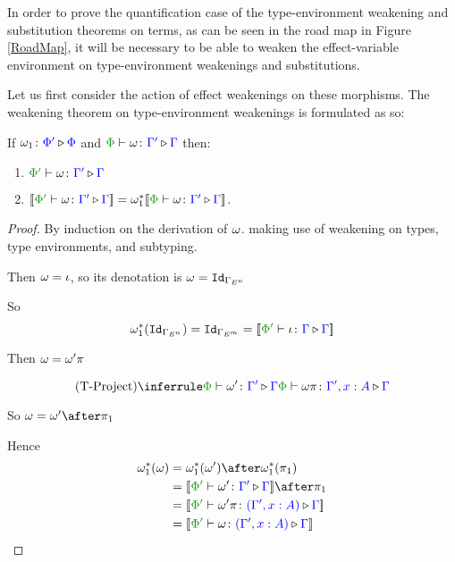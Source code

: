 \documentclass{Report}
\begin{document}
In order to prove the quantification case of the type-environment weakening and substitution theorems on terms, as can be seen in the road map in Figure \ref{RoadMap}, it will be necessary to be able to weaken the effect-variable environment on type-environment weakenings and substitutions.

Let us first consider the action of effect weakenings on these morphisms. The weakening theorem on type-environment weakenings is formulated as so:



\begin{framed}
    \begin{theorem}\label{EffectWeakeningOnTermWeakening}
        If $\omega_1 \colon {\color{blue}\Phi'} \triangleright {\color {blue} \Phi}$ and $\pewrel{\w}{\G'}{\G}$ then:
        \begin{enumerate}[label=\roman*.]
            \item $\ewrel{\P'}{\w}{\G'}{\G}$
            \item $\deno{\ewrel{\P'}{\w}{\G'}{\G}} = \w_1\star\deno{\pewrel{\w}{\G'}{\G}}$.
        \end{enumerate} 
    \end{theorem}
    
    \begin{proof}
        By induction on the derivation of $\omega$. making use of weakening on types, type environments, and subtyping.
    
        \case{\tid}
        Then $\omega = \iota$, so its denotation is $\omega = \texttt{Id}_{\Gamma_{E^n}}$
        
        So
        \begin{equation}
          \w_1\star(\Id{\G_{E^n}}) = \Id{\G_{E^m}} = \deno{\ewrel{\P'}{\i}{\G}{\G}}  
        \end{equation}
        
        \case{\tproject}
        Then $\omega = \omega'\pi$
        
        \begin{equation}
            \ntreeruleI{\tproject}{\ewrel{\P}{\w'}{\G'}{\G}}{\ewrel{\P}{\w\pi}{\G',x:A}{\G}}
        \end{equation}
        
        So $\w = \w'\after\p$
        
        Hence
        \begin{align*}
            \w_1\star(\w) &= \w_1\star(\w')\after\w_1\star(\p)\\
            & = \deno{\ewrel{\P'}{\w'}{\G'}{\G}}\after\p\\
            & = \deno{\ewrel{\P'}{\w'\pi}{(\G',x:A)}{\G}}\\
            & = \deno{\ewrel{\P'}{\w}{(\G', x:A)}{\G}}
        \end{align*}
        

\end{proof}
\end{framed}
\end{document}
